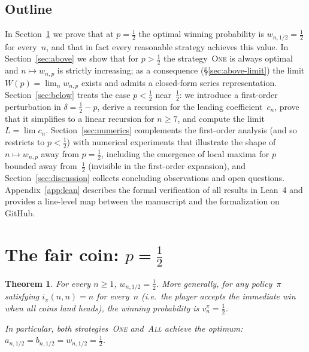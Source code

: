 \documentclass[12pt]{article}
\newtheorem{theorem}{Theorem}[section]
\theoremstyle{definition}
\theoremstyle{remark}
\newcommand{\One}{\textsc{One}}
\newcommand{\All}{\textsc{All}}
\begin{document}
\subsection{Outline}

In Section~\ref{sec:fair} we prove that at $p=\tfrac12$ the optimal
winning probability is $w_{n,1/2}=\tfrac12$ for every~$n$, and that
in fact every reasonable strategy achieves this value.  In
Section~\ref{sec:above} we show that for $p>\tfrac12$ the
strategy~\One{} is always optimal and $n\mapsto w_{n,p}$ is strictly
increasing; as a consequence (\S\ref{sec:above-limit}) the limit
$W(p)=\lim_n w_{n,p}$ exists and admits a closed-form series
representation.  Section~\ref{sec:below} treats the case
$p<\tfrac12$ near~$\tfrac12$: we introduce a first-order
perturbation in $\delta=\tfrac12-p$, derive a recursion for the
leading coefficient~$c_n$, prove that it simplifies to a linear
recursion for $n\ge 7$, and compute the limit $L=\lim c_n$.
Section~\ref{sec:numerics} complements the first-order analysis
(and so restricts to $p<\tfrac12$) with numerical experiments that
illustrate the shape of $n\mapsto w_{n,p}$ away from $p=\tfrac12$,
including the emergence of local maxima for $p$ bounded away
from~$\tfrac12$ (invisible in the first-order expansion), and
Section~\ref{sec:discussion}
collects concluding observations and open questions.
Appendix~\ref{app:lean}
describes the formal verification of all results in Lean~4 and
provides a line-level map between the manuscript and the
formalization on GitHub.

\section{The fair coin: \texorpdfstring{$p=\tfrac12$}{p = 1/2}}
\label{sec:fair}

\begin{theorem}\label{thm:half}
  For every $n\ge 1$, $w_{n,1/2}=\tfrac12$.  More generally, for any
  policy~$\pi$ satisfying $i_\pi(n,n)=n$ for every~$n$ (i.e.\ the
  player accepts the immediate win when all coins land heads), the
  winning probability is $v_n^\pi=\tfrac12$.

  In particular, both strategies~\One{} and~\All{} achieve the
  optimum: $a_{n,1/2}=b_{n,1/2}=w_{n,1/2}=\tfrac12$.
\end{theorem}
\end{document}
